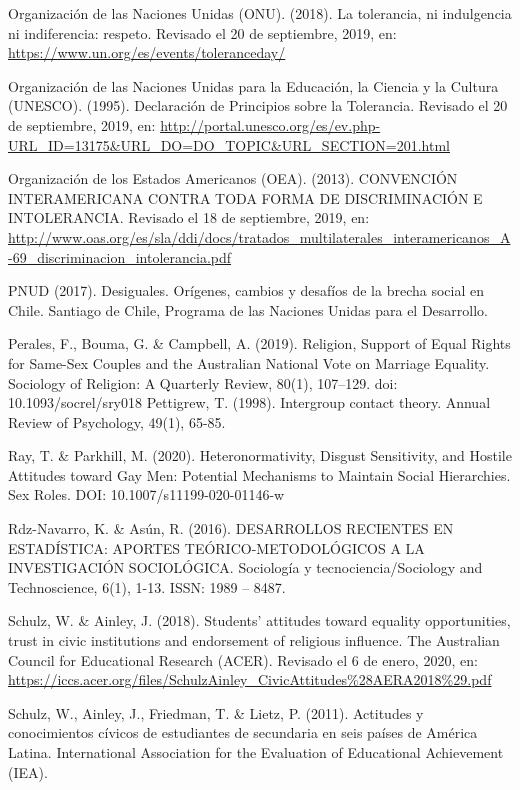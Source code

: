\documentclass[12pt,twoside]{templates/facsothesis}
\begin{document}
Organización de las Naciones Unidas (ONU). (2018). La tolerancia, ni indulgencia ni indiferencia: respeto. Revisado el 20 de septiembre, 2019, en: \url{https://www.un.org/es/events/toleranceday/}

Organización de las Naciones Unidas para la Educación, la Ciencia y la Cultura (UNESCO). (1995). Declaración de Principios sobre la Tolerancia. Revisado el 20 de septiembre, 2019, en: \url{http://portal.unesco.org/es/ev.php-URL_ID=13175\&URL_DO=DO_TOPIC\&URL_SECTION=201.html}

Organización de los Estados Americanos (OEA). (2013). CONVENCIÓN INTERAMERICANA CONTRA TODA FORMA DE DISCRIMINACIÓN E INTOLERANCIA. Revisado el 18 de septiembre, 2019, en: \url{http://www.oas.org/es/sla/ddi/docs/tratados_multilaterales_interamericanos_A-69_discriminacion_intolerancia.pdf}

PNUD (2017). Desiguales. Orígenes, cambios y desafíos de la brecha social en Chile. Santiago de Chile, Programa de las Naciones Unidas para el Desarrollo.

Perales, F., Bouma, G. \& Campbell, A. (2019). Religion, Support of Equal Rights for Same-Sex Couples and the Australian National Vote on Marriage Equality. Sociology of Religion: A Quarterly Review, 80(1), 107--129. doi: 10.1093/socrel/sry018
Pettigrew, T. (1998). Intergroup contact theory. Annual Review of Psychology, 49(1), 65-85.

Ray, T. \& Parkhill, M. (2020). Heteronormativity, Disgust Sensitivity, and Hostile Attitudes toward Gay Men: Potential Mechanisms to Maintain Social Hierarchies. Sex Roles. DOI: 10.1007/s11199-020-01146-w

Rdz-Navarro, K. \& Asún, R. (2016). DESARROLLOS RECIENTES EN ESTADÍSTICA: APORTES TEÓRICO-METODOLÓGICOS A LA INVESTIGACIÓN SOCIOLÓGICA. Sociología y tecnociencia/Sociology and Technoscience, 6(1), 1-13. ISSN: 1989 -- 8487.

Schulz, W. \& Ainley, J. (2018). Students' attitudes toward equality opportunities, trust in civic institutions and endorsement of religious influence. The Australian Council for Educational Research (ACER). Revisado el 6 de enero, 2020, en: \url{https://iccs.acer.org/files/SchulzAinley_CivicAttitudes\%28AERA2018\%29.pdf}

Schulz, W., Ainley, J., Friedman, T. \& Lietz, P. (2011). Actitudes y conocimientos cívicos de estudiantes de secundaria en seis países de América Latina. International Association for the Evaluation of Educational Achievement (IEA).
\end{document}

